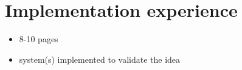 \section{Implementation experience}
\label{sec:implementation}

\begin{itemize} 
    \item 8-10 pages
    \item system(s) implemented to validate the idea
\end{itemize}